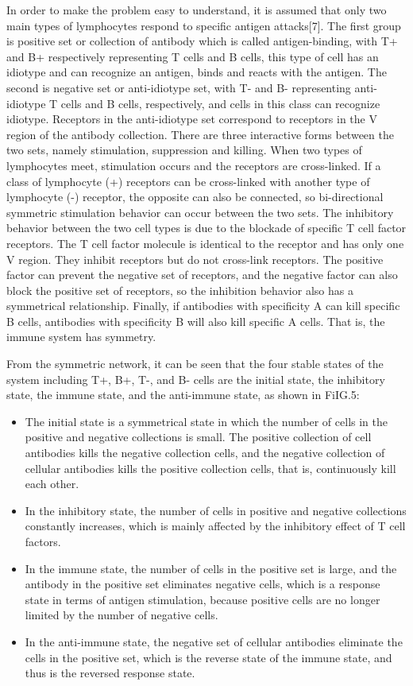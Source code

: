 \documentclass[Proceedings]{ascelike}
\begin{document}
\par
In order to make the problem easy to understand, it is assumed that only two main types of lymphocytes respond to specific antigen attacks[7]. The first group is positive set or collection of antibody which is called antigen-binding, with T+ and B+ respectively representing T cells and B cells, this type of cell has an idiotype and can recognize an antigen, binds and reacts with the antigen. The second is negative set or anti-idiotype set, with T- and B- representing anti-idiotype T cells and B cells, respectively, and cells in this class can recognize idiotype. Receptors in the anti-idiotype set correspond to receptors in the V region of the antibody collection. There are three interactive forms between the two sets, namely stimulation, suppression and killing. When two types of lymphocytes meet, stimulation occurs and the receptors are cross-linked. If a class of lymphocyte (+) receptors can be cross-linked with another type of lymphocyte (-) receptor, the opposite can also be connected, so bi-directional symmetric stimulation behavior can occur between the two sets. The inhibitory behavior between the two cell types is due to the blockade of specific T cell factor receptors. The T cell factor molecule is identical to the receptor and has only one V region. They inhibit receptors but do not cross-link receptors. The positive factor can prevent the negative set of receptors, and the negative factor can also block the positive set of receptors, so the inhibition behavior also has a symmetrical relationship. Finally, if antibodies with specificity A can kill specific B cells, antibodies with specificity B will also kill specific A cells. That is, the immune system has symmetry.
\par
From the symmetric network, it can be seen that the four stable states of the system including T+, B+, T-, and B- cells are the initial state, the inhibitory state, the immune state, and the anti-immune state, as shown in FiIG.5:
\begin{itemize} 
\item
 The initial state is a symmetrical state in which the number of cells in the positive and negative collections is small. The positive collection of cell antibodies kills the negative collection cells, and the negative collection of cellular antibodies kills the positive collection cells, that is, continuously kill each other. 
\item
In the inhibitory state, the number of cells in positive and negative collections constantly increases, which is mainly affected by the inhibitory effect of T cell factors. 
\item
In the immune state, the number of cells in the positive set is large, and the antibody in the positive set eliminates negative cells, which is a response state in terms of antigen stimulation, because positive cells are no longer limited by the number of negative cells. 
\item
 In the anti-immune state, the negative set of cellular antibodies eliminate the cells in the positive set, which is the reverse state of the immune state, and thus is the reversed response state.
\end{itemize}
\end{document}
